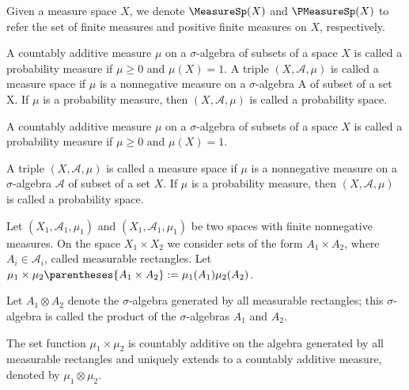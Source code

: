 Given a measure space $X$, we denote $\MeasureSp(X)$ and $\PMeasureSp(X)$ to refer the set of finite measures and positive finite measures on $X$, respectively. 

\begin{definition}
	A countably additive measure $\mu$ on a $\sigma$-algebra of subsets of a space $X$ is called a probability measure if $\mu\geq 0$ and $\mu(X)=1$.
	A triple $(X, \mathcal A, \mu)$ is called a measure space if $\mu$ is a
	nonnegative measure on a $\sigma$-algebra A of subset of a set X. If $\mu$ is a probability measure, then $(X, \mathcal A, \mu)$ is called a probability space. 
\end{definition}


\begin{definition}
\end{definition}

\begin{definition}
\end{definition}

\begin{definition}[Probability]
	A countably additive measure $\mu$ on a $\sigma$-algebra of subsets of a space $X$ is called a probability measure if $\mu \geq 0$ and $\mu(X)= 1$.
	
	A triple $(X, \mathcal A, \mu )$ is called a measure space if $\mu$ is a
	nonnegative measure on a $\sigma$-algebra $\mathcal A$ of subset of a set $X$. If $\mu$ is a probability measure, then $(X, \mathcal A, \mu)$ is called a probability space.
\end{definition}

\begin{definition}
Let $\left(X_1 , \mathcal{A}_1 , \mu_1 \right)$ and $\left(X_1 , \mathcal{A}_1 , \mu_1 \right)$ be two spaces with finite nonnegative measures. On the space $X_1\times X_2$ we consider sets of the form $A_1\times A_2$, where $A_i \in \mathcal{A}_i$, called measurable rectangles. Let $\mu_1\times \mu_2 \parentheses{A_1\times A_2}:= \mu_1(A_1)\mu_2(A_2)$. 

Let $A_1\otimes A_2$ denote the $\sigma$-algebra generated by all measurable rectangles; this $\sigma$-algebra is called the product of the $\sigma$-algebras $A_1$ and $A_2$.  
\end{definition}

\begin{theorem}
The set function $\mu_1\times \mu_2$ is countably additive on the algebra generated by all measurable rectangles and uniquely extends to a countably additive measure, denoted by $\mu_1\otimes \mu_2$.
\end{theorem}

